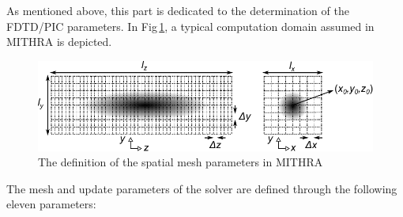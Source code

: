 As mentioned above, this part is dedicated to the determination of the FDTD/PIC parameters.
%
In Fig\,\ref{RefcardFig1}, a typical computation domain assumed in MITHRA is depicted.
%
\begin{figure}
\centering
\includegraphics[width=5.0in]{./MITHRA_UI/Fig1.pdf}
\caption{The definition of the spatial mesh parameters in MITHRA}
\label{RefcardFig1}
\end{figure}
%
The mesh and update parameters of the solver are defined through the following eleven parameters:
%
